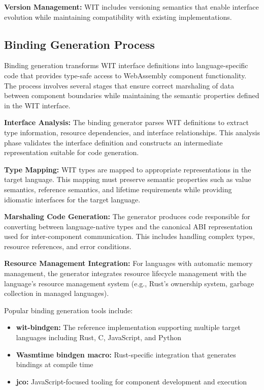 \textbf{Version Management:} WIT includes versioning semantics that enable interface evolution while maintaining compatibility with existing implementations.


\subsection{Binding Generation Process}
\label{subsec:binding-generation}

Binding generation transforms WIT interface definitions into language-specific code that provides type-safe access to WebAssembly component functionality. The process involves several stages that ensure correct marshaling of data between component boundaries while maintaining the semantic properties defined in the WIT interface.

\textbf{Interface Analysis:} The binding generator parses WIT definitions to extract type information, resource dependencies, and interface relationships. This analysis phase validates the interface definition and constructs an intermediate representation suitable for code generation.

\textbf{Type Mapping:} WIT types are mapped to appropriate representations in the target language. This mapping must preserve semantic properties such as value semantics, reference semantics, and lifetime requirements while providing idiomatic interfaces for the target language.

\textbf{Marshaling Code Generation:} The generator produces code responsible for converting between language-native types and the canonical ABI representation used for inter-component communication. This includes handling complex types, resource references, and error conditions.

\textbf{Resource Management Integration:} For languages with automatic memory management, the generator integrates resource lifecycle management with the language's resource management system (e.g., Rust's ownership system, garbage collection in managed languages).

Popular binding generation tools include:

\begin{itemize}
    \item \textbf{wit-bindgen:} The reference implementation supporting multiple target languages including Rust, C, JavaScript, and Python
    \item \textbf{Wasmtime bindgen macro:} Rust-specific integration that generates bindings at compile time
    \item \textbf{jco:} JavaScript-focused tooling for component development and execution
\end{itemize}

